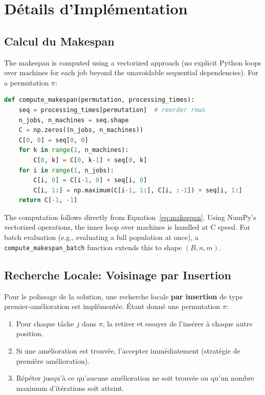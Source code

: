 \documentclass[12pt,a4paper,oneside]{report}
\begin{document}
\chapter{D\'etails d'Impl\'ementation}

\section{Calcul du Makespan}

The makespan is computed using a vectorized approach (no explicit Python loops over machines for each job beyond the unavoidable sequential dependencies). For a permutation $\pi$:

\begin{lstlisting}[language=Python, caption={Vectorized makespan computation}]
def compute_makespan(permutation, processing_times):
    seq = processing_times[permutation]  # reorder rows
    n_jobs, n_machines = seq.shape
    C = np.zeros((n_jobs, n_machines))
    C[0, 0] = seq[0, 0]
    for k in range(1, n_machines):
        C[0, k] = C[0, k-1] + seq[0, k]
    for i in range(1, n_jobs):
        C[i, 0] = C[i-1, 0] + seq[i, 0]
        C[i, 1:] = np.maximum(C[i-1, 1:], C[i, :-1]) + seq[i, 1:]
    return C[-1, -1]
\end{lstlisting}

The computation follows directly from Equation~\ref{eq:makespan}. Using NumPy's vectorized operations, the inner loop over machines is handled at C speed. For batch evaluation (e.g., evaluating a full population at once), a \texttt{compute\_makespan\_batch} function extends this to shape $(B, n, m)$.

\section{Recherche Locale: Voisinage par Insertion}

Pour le polissage de la solution, une recherche locale \textbf{par insertion} de type premier-am\'elioration est impl\'ement\'ee. \'Etant donn\'e une permutation $\pi$:

\begin{enumerate}[itemsep=2pt]
    \item Pour chaque t\^ache $j$ dans $\pi$, la retirer et essayer de l'ins\'erer \`a chaque autre position.
    \item Si une am\'elioration est trouv\'ee, l'accepter imm\'ediatement (strat\'egie de premi\`ere am\'elioration).
    \item R\'ep\'eter jusqu'\`a ce qu'aucune am\'elioration ne soit trouv\'ee ou qu'un nombre maximum d'it\'erations soit atteint.
\end{enumerate}
\end{document}
